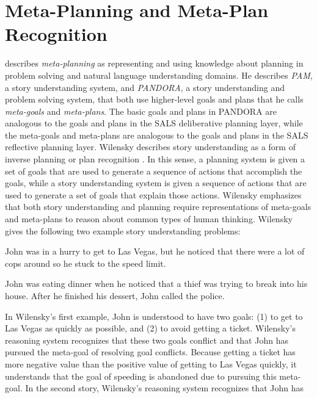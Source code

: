 \section{Meta-Planning and Meta-Plan Recognition}
\label{section:meta_planning_and_meta_plan_recognition}

\cite{wilensky:1981} describes {\emph{meta-planning}} as representing
and using knowledge about planning in problem solving and natural
language understanding domains.  He describes {\emph{PAM}}, a story
understanding system, and {\emph{PANDORA}}, a story understanding and
problem solving system, that both use higher-level goals and plans
that he calls {\emph{meta-goals}} and {\emph{meta-plans}}.  The basic
goals and plans in PANDORA are analogous to the goals and plans in the
SALS deliberative planning layer, while the meta-goals and meta-plans
are analogous to the goals and plans in the SALS reflective planning
layer.  Wilensky describes story understanding as a form of inverse
planning or plan recognition \cite[]{kautz:1987,charniak:1993,kerkez:2003}.  In this sense, a planning system is
given a set of goals that are used to generate a sequence of actions
that accomplish the goals, while a story understanding system is given
a sequence of actions that are used to generate a set of goals that
explain those actions.  Wilensky emphasizes that both story
understanding and planning require representations of meta-goals and
meta-plans to reason about common types of human thinking.  Wilensky
gives the following two example story understanding problems:
\begin{packed_enumerate}
\item{John was in a hurry to get to Las Vegas, but he noticed that
  there were a lot of cops around so he stuck to the speed limit.}
\item{John was eating dinner when he noticed that a thief was trying
  to break into his house.  After he finished his dessert, John called
  the police.}
\end{packed_enumerate}
In Wilensky's first example, John is understood to have two goals: (1)
to get to Las Vegas as quickly as possible, and (2) to avoid getting a
ticket.  Wilensky's reasoning system recognizes that these two goals
conflict and that John has pursued the meta-goal of resolving goal
conflicts.  Because getting a ticket has more negative value than the
positive value of getting to Las Vegas quickly, it understands that
the goal of speeding is abandoned due to pursuing this meta-goal.  In
the second story, Wilensky's reasoning system recognizes that John has
